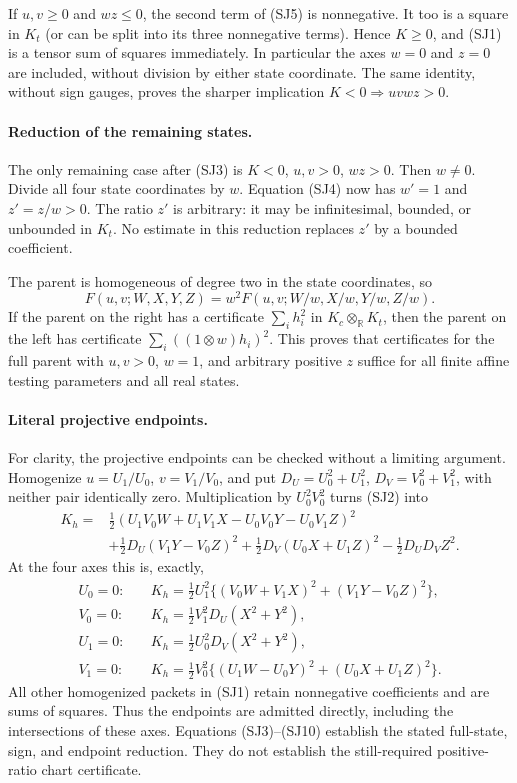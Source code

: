 If $u,v\geq0$ and $wz\leq0$, the second term of (SJ5) is nonnegative.
It too is a square in $K_t$ (or can be split into its three nonnegative
terms).  Hence $K\geq0$, and (SJ1) is a tensor sum of squares immediately.
In particular the axes $w=0$ and $z=0$ are included, without division by
either state coordinate.  The same identity, without sign gauges, proves
the sharper implication $K<0\Longrightarrow uvwz>0$.

\paragraph{Reduction of the remaining states.}
The only remaining case after (SJ3) is $K<0$, $u,v>0$, $wz>0$.
Then $w\ne0$.  Divide all four state coordinates by $w$.  Equation (SJ4)
now has $w'=1$ and $z'=z/w>0$.  The ratio $z'$ is arbitrary: it may be
infinitesimal, bounded, or unbounded in $K_t$.  No estimate in this
reduction replaces $z'$ by a bounded coefficient.

The parent is homogeneous of degree two in the state coordinates, so
\[
 F(u,v;W,X,Y,Z)=w^2F(u,v;W/w,X/w,Y/w,Z/w).               \tag{SJ8}
\]
If the parent on the right has a certificate $\sum_i h_i^2$ in
$K_c\otimes_{\mathbb R}K_t$, then the parent on the left has certificate
$\sum_i((1\otimes w)h_i)^2$.  This proves that certificates for the full
parent with $u,v>0$, $w=1$, and arbitrary positive $z$ suffice for all
finite affine testing parameters and all real states.

\paragraph{Literal projective endpoints.}
For clarity, the projective endpoints can be checked without a limiting
argument.  Homogenize $u=U_1/U_0$, $v=V_1/V_0$, and put
$D_U=U_0^2+U_1^2$, $D_V=V_0^2+V_1^2$, with neither pair identically zero.
Multiplication by $U_0^2V_0^2$ turns (SJ2) into
\begin{align}
 K_h={}&\tfrac12(U_1V_0W+U_1V_1X-U_0V_0Y-U_0V_1Z)^2\\
       &+\tfrac12D_U(V_1Y-V_0Z)^2
        +\tfrac12D_V(U_0X+U_1Z)^2-\tfrac12D_UD_VZ^2.     \tag{SJ9}
\end{align}
At the four axes this is, exactly,
\begin{align}
 U_0=0:\quad &K_h=\tfrac12U_1^2\{(V_0W+V_1X)^2+(V_1Y-V_0Z)^2\},\\
 V_0=0:\quad &K_h=\tfrac12V_1^2D_U(X^2+Y^2),\\
 U_1=0:\quad &K_h=\tfrac12U_0^2D_V(X^2+Y^2),\\
 V_1=0:\quad &K_h=\tfrac12V_0^2\{(U_1W-U_0Y)^2+(U_0X+U_1Z)^2\}.
                                                               \tag{SJ10}
\end{align}
All other homogenized packets in (SJ1) retain nonnegative coefficients
and are sums of squares.  Thus the endpoints are admitted directly,
including the intersections of these axes.  Equations (SJ3)--(SJ10)
establish the stated full-state, sign, and endpoint reduction.  They do
not establish the still-required positive-ratio chart certificate.

